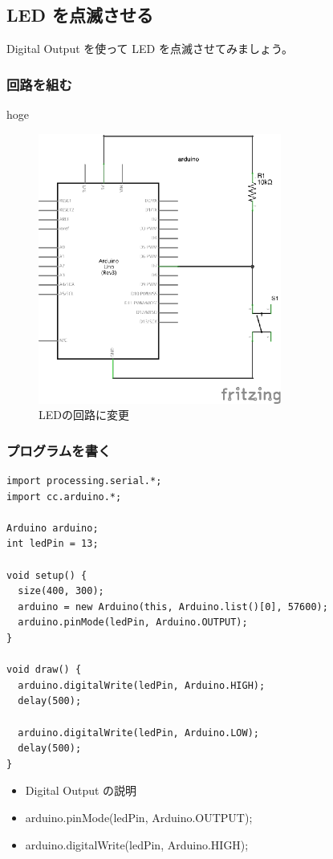 \documentclass[11pt,a4paper]{jarticle}
\begin{document}
\subsection*{LED を点滅させる}
Digital Output を使って LED を点滅させてみましょう。

\subsubsection*{回路を組む}
hoge

\begin{figure}[h!]
 \centering
 \includegraphics[width=80mm]{img/pullup.eps}
 \caption{LEDの回路に変更}
\end{figure}

\subsubsection*{プログラムを書く}
\begin{lstlisting}
import processing.serial.*;
import cc.arduino.*;
 
Arduino arduino;
int ledPin = 13;
 
void setup() {
  size(400, 300);
  arduino = new Arduino(this, Arduino.list()[0], 57600);
  arduino.pinMode(ledPin, Arduino.OUTPUT);
}
 
void draw() {
  arduino.digitalWrite(ledPin, Arduino.HIGH);
  delay(500);
  
  arduino.digitalWrite(ledPin, Arduino.LOW);
  delay(500);  
}
\end{lstlisting}

\begin{itemize}
 \item Digital Output の説明
 \item arduino.pinMode(ledPin, Arduino.OUTPUT);
 \item arduino.digitalWrite(ledPin, Arduino.HIGH);
\end{itemize}
\end{document}
